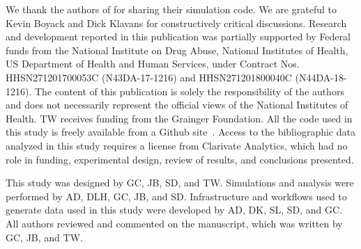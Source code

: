 \documentclass[NETN]{stjour}
\begin{document}
\acknowledgments
 We thank the authors of \cite{uzzi_atypical_2013} for sharing their simulation code. We are grateful to Kevin Boyack and Dick Klavans for constructively critical discussions. Research and development reported in this publication was partially supported by Federal funds from the National Institute on Drug Abuse, National Institutes of Health, US Department of Health and Human Services, under Contract Nos. HHSN271201700053C (N43DA-17-1216) and HHSN271201800040C (N44DA-18-1216). The content of this publication is solely the responsibility of the authors and does not necessarily represent the official views of the National Institutes of Health. TW receives funding from the Grainger Foundation. All the code used in this study is freely available from a Github site~\citep{GithubERNIE2019}. Access to the bibliographic data analyzed in this study requires a license from Clarivate Analytics, which had no role in funding, experimental design, review of results, and conclusions presented. 

\authorcontributions 
This study was designed by GC, JB, SD, and TW. Simulations and analysis were performed by AD, DLH, GC, JB, and SD. Infrastructure and workflows used to generate data used in this study were developed by AD, DK, SL, SD, and GC.  All authors reviewed and commented on the manuscript, which was written by GC, JB, and TW.


\end{document}
